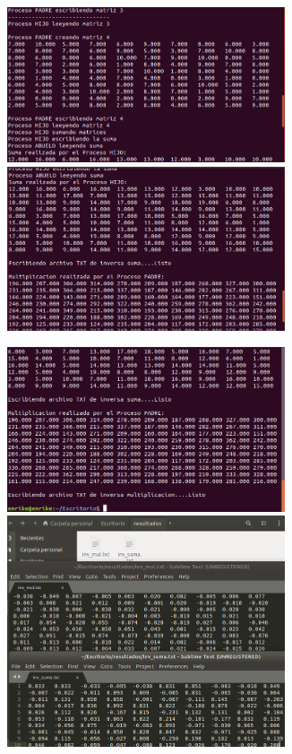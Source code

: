 \documentclass[12pt]{article}
\begin{document}
\begin{itemize}
\begin{figure}[h!]
                       \includegraphics[width=0.73\textwidth]{Practica6/Images/Linux/7_3.png}
                       
                       \includegraphics[width=0.73\textwidth]{Practica6/Images/Linux/7_4.png}
                       
                \end{figure}
            \clearpage
                \begin{figure}[h!]
                        \centering
                         \includegraphics[width=0.73\textwidth]{Practica6/Images/Linux/7_5.png}
                       \includegraphics[width=0.73\textwidth]{Practica6/Images/Linux/7_6.png}
                       

\end{figure}
\end{itemize}
\end{document}

